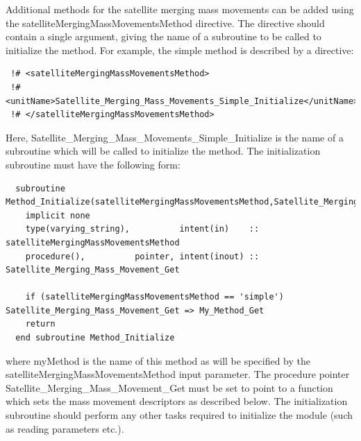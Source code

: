 Additional methods for the satellite merging mass movements can be added using the {\normalfont \ttfamily satelliteMergingMassMovementsMethod} directive. The directive should contain a single argument, giving the name of a subroutine to be called to initialize the method. For example, the {\normalfont \ttfamily simple} method is described by a directive:
\begin{verbatim}
 !# <satelliteMergingMassMovementsMethod>
 !#  <unitName>Satellite_Merging_Mass_Movements_Simple_Initialize</unitName>
 !# </satelliteMergingMassMovementsMethod>
\end{verbatim}
Here, {\normalfont \ttfamily Satellite\_Merging\_Mass\_Movements\_Simple\_Initialize} is the name of a subroutine which will be called to initialize the method. The initialization subroutine must have the following form:
\begin{verbatim}
  subroutine Method_Initialize(satelliteMergingMassMovementsMethod,Satellite_Merging_Mass_Movement_Get)
    implicit none
    type(varying_string),          intent(in)    :: satelliteMergingMassMovementsMethod
    procedure(),          pointer, intent(inout) :: Satellite_Merging_Mass_Movement_Get
    
    if (satelliteMergingMassMovementsMethod == 'simple') Satellite_Merging_Mass_Movement_Get => My_Method_Get
    return
  end subroutine Method_Initialize
\end{verbatim}
where {\normalfont \ttfamily myMethod} is the name of this method as will be specified by the {\normalfont \ttfamily satelliteMergingMassMovementsMethod} input parameter. The procedure pointer {\normalfont \ttfamily Satellite\_Merging\_Mass\_Movement\_Get} must be set to point to a function which sets the mass movement descriptors as described below. The initialization subroutine should perform any other tasks required to initialize the module (such as reading parameters etc.).

